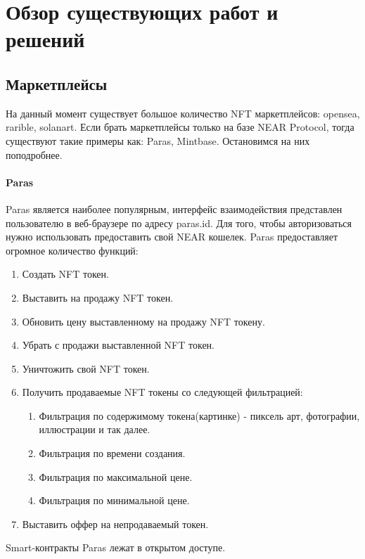\section{Обзор существующих работ и решений}
\label{section.3}
\subsection{Маркетплейсы}
На данный момент существует большое количество NFT маркетплейсов: opensea\cite{opensea}, rarible\cite{rarible}, solanart\cite{solanart}. Если брать маркетплейсы только на базе NEAR Protocol, тогда существуют такие примеры как: Paras\cite{paras}, Mintbase\cite{mintbase}. Остановимся на них поподробнее.

\paragraph{Paras}

Paras является наиболее популярным, интерфейс взаимодействия представлен пользователю в веб-браузере по адресу paras.id. Для того, чтобы авторизоваться нужно использовать
предоставить свой NEAR кошелек. Paras предоставляет огромное количество функций:
\begin{enumerate}
    \item Создать NFT токен.
    \item Выставить на продажу NFT токен.
    \item Обновить цену выставленному на продажу NFT токену.
    \item Убрать с продажи выставленной NFT токен.
    \item Уничтожить свой NFT токен.
    \item Получить продаваемые NFT токены со следующей фильтрацией:
        \begin{enumerate}
            \item Фильтрация по содержимому токена(картинке) - пиксель арт, фотографии, иллюстрации и так далее.
            \item Фильтрация по времени создания.
            \item Фильтрация по максимальной цене.
            \item Фильтрация по минимальной цене.
        \end{enumerate}
    \item Выставить оффер на непродаваемый токен.
\end{enumerate}

Smart-контракты Paras лежат в открытом доступе\cite{parasnftcontract, parasmarketplacecontract}.

